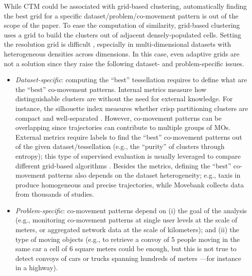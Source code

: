 \documentclass[preprint,12pt,authoryear]{elsarticle} %
\begin{document}
While CTM could be associated with grid-based clustering, automatically finding the best grid for a specific dataset/problem/co-movement pattern is out of the scope of the paper.
To ease the computation of similarity, grid-based clustering uses a grid to build the clusters out of adjacent densely-populated cells.
Setting the resolution grid is difficult \citep{parsons2004evaluating,DBLP:journals/tkde/JinHZXFOZ22}, especially in multi-dimensional datasets with heterogeneous densities across dimensions.
In this case, even adaptive grids \citep{DBLP:conf/adma/LuSXL05}
are not a solution since they raise the following dataset- and problem-specific issues.
\begin{itemize}
    \item \textit{Dataset-specific}: computing the ``best'' tessellation requires to define what are the ``best'' co-movement patterns.
    Internal metrics measure how distinguishable clusters are without the need for external knowledge.
    For instance, the silhouette index measures whether crisp partitioning clusters are compact and well-separated \citep{zhu2010clustering}.
    However, co-movement patterns can be overlapping since trajectories can contribute to multiple groups of MOs.
    External metrics require labels to find the ``best'' co-movement patterns out of the given dataset/tessellation (e.g., the ``purity'' of clusters through entropy); this type of supervised evaluation is usually leveraged to compare different grid-based algorithms \citep{parsons2004evaluating}.
    Besides the metrics, defining the ``best'' co-movement patterns also depends on the dataset heterogeneity; e.g., taxis in \citep{DBLP:conf/gis/YuanZZXXSH10} produce homogeneous and precise trajectories, while Movebank \citep{DBLP:journals/envsoft/KranstauberCWFTWK11} collects data from thousands of studies.
    \item \textit{Problem-specific}: co-movement patterns depend on (i) the goal of the analysis (e.g., monitoring co-movement patterns at single user levels at the scale of meters, or aggregated network data
    at the scale of kilometers); and (ii) the type of moving objects (e.g., to retrieve a convoy of 5 people moving in the same car a cell of 6 square meters could be enough, but this is not true to detect convoys of cars or trucks spanning hundreds of meters ---for instance in a highway).
\end{itemize}
\end{document}

